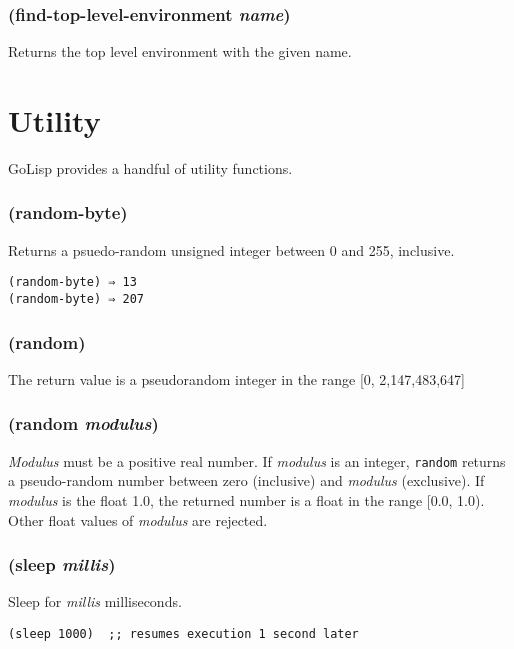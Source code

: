 \documentclass{article}
\begin{document}
\subsubsection{(find-top-level-environment \emph{name})}

Returns the top level environment with the given name.

\section{Utility}\label{sec:utility}

GoLisp provides a handful of utility functions.

\subsubsection{(random-byte)}

Returns a psuedo-random unsigned integer between 0 and 255, inclusive.

\begin{verbatim}
(random-byte) ⇒ 13
(random-byte) ⇒ 207
\end{verbatim}

\subsubsection{(random)}

The return value is a pseudorandom integer in the range [0, 2,147,483,647]

\subsubsection{(random \emph{modulus})}

\emph{Modulus} must be a positive real number. If \emph{modulus} is an integer,
\verb|random| returns a pseudo-random number between zero (inclusive) and \emph{modulus}
(exclusive). If \emph{modulus} is the float 1.0, the returned number is a float in the range
[0.0, 1.0). Other float values of \emph{modulus} are rejected.

\subsubsection{(sleep \emph{millis})}

Sleep for \emph{millis} milliseconds.

\begin{verbatim}
(sleep 1000)  ;; resumes execution 1 second later
\end{verbatim}
\end{document}
